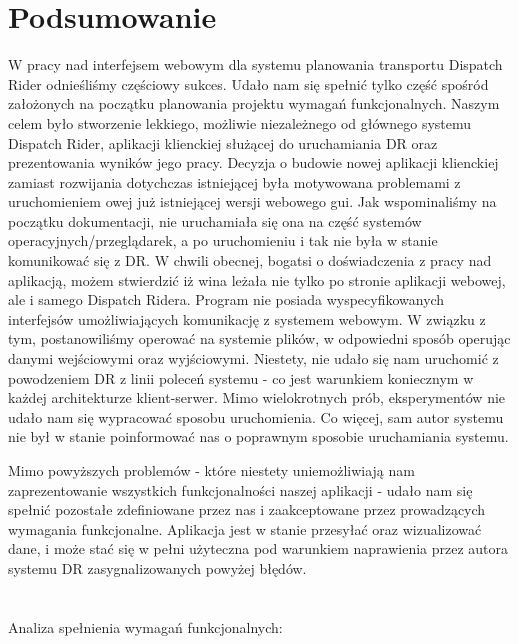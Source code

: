 \chapter{Podsumowanie}

W pracy nad interfejsem webowym dla systemu planowania transportu Dispatch Rider odnieśliśmy częściowy sukces. Udało nam się spełnić tylko część spośród założonych na początku planowania projektu wymagań funkcjonalnych. 
Naszym celem było stworzenie lekkiego, możliwie niezależnego od głównego systemu Dispatch Rider, aplikacji klienckiej służącej do uruchamiania DR oraz prezentowania wyników jego pracy. Decyzja o budowie nowej aplikacji klienckiej zamiast rozwijania dotychczas istniejącej była motywowana problemami z uruchomieniem owej już istniejącej wersji webowego gui. Jak wspominaliśmy na początku dokumentacji, nie uruchamiała się ona na część systemów operacyjnych/przeglądarek, a po uruchomieniu i tak nie była w stanie komunikować się z DR.
W chwili obecnej, bogatsi o doświadczenia z pracy nad aplikacją, możem stwierdzić iż wina leżała nie tylko po stronie aplikacji webowej, ale i samego Dispatch Ridera.
Program nie posiada wyspecyfikowanych interfejsów umożliwiających komunikację z systemem webowym. W związku z tym, postanowiliśmy operować na systemie plików, w odpowiedni sposób operując danymi wejściowymi oraz wyjściowymi.
Niestety, nie udało się nam uruchomić z powodzeniem DR z linii poleceń systemu - co jest warunkiem koniecznym w każdej architekturze klient-serwer. Mimo wielokrotnych prób, eksperymentów nie udało nam się wypracować sposobu uruchomienia. Co więcej, sam autor systemu nie był w stanie poinformować nas o poprawnym sposobie uruchamiania systemu. 

Mimo powyższych problemów - które niestety uniemożliwiają nam zaprezentowanie wszystkich funkcjonalności naszej aplikacji - udało nam się spełnić pozostałe zdefiniowane przez nas i zaakceptowane przez prowadzących wymagania funkcjonalne. Aplikacja jest w stanie przesyłać oraz wizualizować dane, i może stać się w pełni użyteczna pod warunkiem naprawienia przez autora systemu DR zasygnalizowanych powyżej błędów.
\\\\\\
Analiza spełnienia wymagań funkcjonalnych:
\\\\


